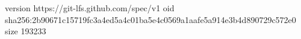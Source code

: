 version https://git-lfs.github.com/spec/v1
oid sha256:2b90671c15719fc3a4ed5a4c01ba5e4c0569a1aafe5a914e3b4d890729c572e0
size 193233
